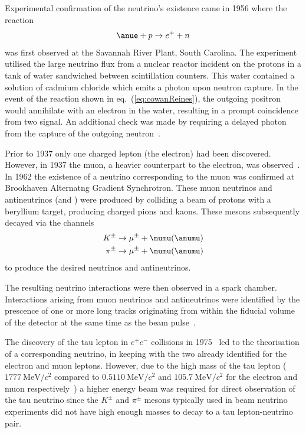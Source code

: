 Experimental confirmation of the neutrino's existence came in 1956 where the reaction
\begin{equation}
  \anue + p \rightarrow e^{+} + n
  \label{eq:cowanReines}
\end{equation}
was first observed at the Savannah River Plant, South Carolina. The experiment utilised the large neutrino flux from a nuclear reactor incident on the protons in a tank of water sandwiched between scintillation counters.
This water contained a solution of cadmium chloride which emits a photon upon neutron capture.
In the event of the reaction shown in eq.~(\ref{eq:cowanReines}), the outgoing positron would annihilate with an electron in the water, resulting in a prompt coincidence from two signal.
An additional check was made by requiring a delayed photon from the capture of the outgoing neutron~\cite{cowanReines}.

Prior to 1937 only one charged lepton (the electron) had been discovered.
However, in 1937 the muon, a heavier counterpart to the electron, was observed~\cite{muonDiscovery}.
In 1962 the existence of a neutrino corresponding to the muon was confirmed at Brookhaven Alternatng Gradient Synchrotron.
These muon neutrinos and antineutrinos (\numu and \anumu) were produced by colliding a beam of protons with a beryllium target, producing charged pions and kaons.
These mesons subsequently decayed via the channels
\begin{align}
    K^{\pm} \rightarrow \mu^{\pm} + \numu(\anumu) \\
    \pi^{\pm} \rightarrow \mu^{\pm} + \numu(\anumu)
\end{align}
to produce the desired neutrinos and antineutrinos.

The resulting neutrino interactions were then observed in a spark chamber.
Interactions arising from muon neutrinos and antineutrinos were identified by the prescence of one or more long tracks originating from within the fiducial volume of the detector at the same time as the beam pulse~\cite{numuDiscovery}.   

The discovery of the tau lepton in $e^{+}e^{-}$ collisions in 1975~\cite{tauLepton} led to the theorisation of a corresponding neutrino, in keeping with the two already identified for the electron and muon leptons.
However, due to the high mass of the tau lepton ($1777~\text{MeV}/c^{2}$ compared to $0.5110~\text{MeV}/c^{2}$ and $105.7~\text{MeV}/c^{2}$ for the electron and muon respectively~\cite{pdg2018}) a higher energy beam was required for direct observation of the tau neutrino since the $K^{\pm}$ and $\pi^{\pm}$ mesons typically used in beam neutrino experiments did not have high enough masses to decay to a tau lepton-neutrino pair.

